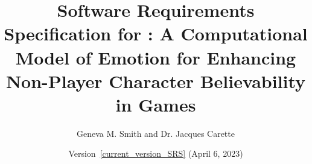 \documentclass[11pt, titlepage]{article}
\begin{document}
    \setcounter{pages}{\totalpages}

    \begin{titlepage}
        \thispagestyle{empty}

        \title{Software Requirements Specification for \progname{}: A
        Computational Model of Emotion for Enhancing Non-Player Character
        Believability in Games}
        \author{Geneva M. Smith and Dr. Jacques Carette}
        \date{Version~\ref{current_version_SRS} (April 6, 2023)}

        \maketitle
    \end{titlepage}

    \pagestyle{fancy}
\end{document}
